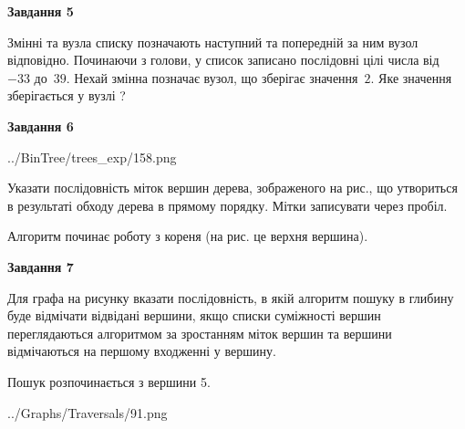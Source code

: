 \documentclass[12pt, ukrainian]{article}
\begin{document}
{\begin {large}
{\begin {center}\textbf{Завдання 5}\end {center}}\par
Змінні  та  вузла списку позначають наступний та попередній за ним вузол відповідно. Починаючи з голови, у список записано послідовні цілі числа від~$-33$ до~$39$. Нехай змінна  позначає вузол, що зберігає значення~$2$.
Яке значення зберігається у вузлі  ?\par
\newpage

{\begin {center}\textbf{Завдання 6}\end {center}}\par

\begin{center}
	{../BinTree/trees_exp/158.png}
\end{center}
Указати послідовність міток вершин дерева, зображеного на рис., що утвориться в результаті обходу дерева в прямому порядку. Мітки записувати через пробіл.\par Алгоритм починає роботу з кореня (на рис. це верхня вершина).\par
\newpage

{\begin {center}\textbf{Завдання 7}\end {center}}\par
Для графа на рисунку вказати послідовність, в якій алгоритм пошуку в глибину буде відмічати відвідані вершини, якщо списки суміжності вершин переглядаються алгоритмом за зростанням міток вершин та вершини відмічаються на першому вход\-женні у вершину.\par
Пошук розпочинається з вершини 5.\par

\begin{center}
	{../Graphs/Traversals/91.png}
\end{center}\par
\newpage


\end{large}}
\end{document}
